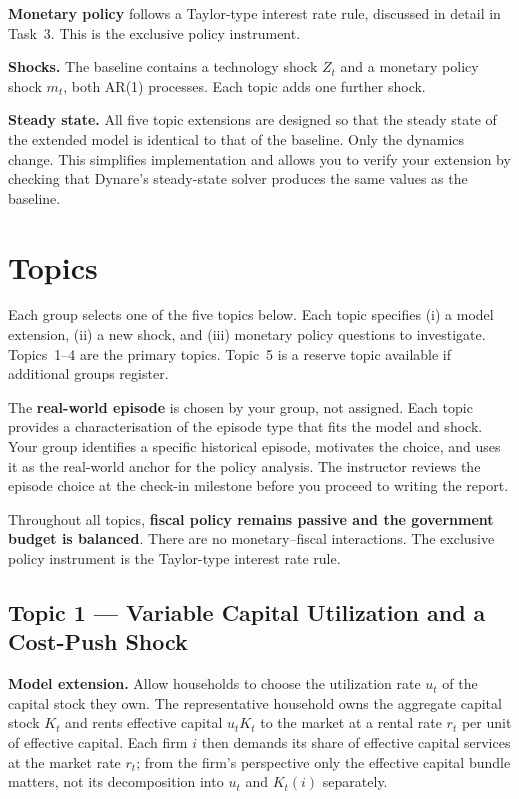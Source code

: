 \documentclass[11pt, a4paper]{article}
\begin{document}
\textbf{Monetary policy} follows a Taylor-type interest rate rule, discussed in
detail in Task~3. This is the exclusive policy instrument.

\textbf{Shocks.} The baseline contains a technology shock $Z_t$ and a monetary
policy shock $m_t$, both AR(1) processes. Each topic adds one further shock.

\textbf{Steady state.} All five topic extensions are designed so that the
steady state of the extended model is identical to that of the baseline. Only
the dynamics change. This simplifies implementation and allows you to verify
your extension by checking that Dynare's steady-state solver produces the same
values as the baseline.

\section{Topics}

Each group selects one of the five topics below. Each topic specifies (i) a
model extension, (ii) a new shock, and (iii) monetary policy questions to
investigate. Topics~1--4 are the primary topics. Topic~5 is a reserve topic
available if additional groups register.

The \textbf{real-world episode} is chosen by your group, not assigned. Each
topic provides a characterisation of the episode type that fits the model and
shock. Your group identifies a specific historical episode, motivates the
choice, and uses it as the real-world anchor for the policy analysis. The
instructor reviews the episode choice at the check-in milestone before you
proceed to writing the report.

Throughout all topics, \textbf{fiscal policy remains passive and the government
budget is balanced}. There are no monetary--fiscal interactions. The exclusive
policy instrument is the Taylor-type interest rate rule.

\subsection{Topic 1 --- Variable Capital Utilization and a Cost-Push Shock}

\textbf{Model extension.} Allow households to choose the utilization rate $u_t$
of the capital stock they own. The representative household owns the aggregate
capital stock $K_t$ and rents effective capital $u_t K_t$ to the market at a
rental rate $r_t$ per unit of effective capital. Each firm $i$ then demands its
share of effective capital services at the market rate $r_t$; from the firm's
perspective only the effective capital bundle matters, not its decomposition
into $u_t$ and $K_t(i)$ separately.
\end{document}
